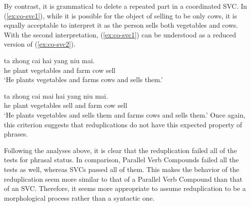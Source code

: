     \z
\z

By contrast, it is grammatical to delete a repeated part in a coordinated {SVC}. 
In (\ref{ex:co-svc1}), while it is possible for the object of selling to be only cows, it is equally acceptable to interpret it as the person sells both vegetables and cows. With the second interpretation, (\ref{ex:co-svc1}) can be understood as a reduced version of (\ref{ex:co-svc2}).

\ea
  \ea\label{ex:co-svc1}
  \gll ta zhong cai hai yang niu mai.\\
  he plant vegetables and farm cow sell\\
  \glt `He plants vegetables and farms cows and sells them.'
  
  \ex\label{ex:co-svc2}
  \gll ta zhong cai mai hai yang niu mai.\\
  he plant vegetables sell and farm cow sell\\
  \glt `He plants vegetables and sells them and farms cows and sells them.'
   \z
\z
Once again, this criterion suggests that reduplications do not have this expected property of phrases.


Following the analyses above, it is clear that the reduplication failed all of the tests for phrasal status. 
In comparison, Parallel Verb Compounds failed all the tests as well, whereas {SVC}s passed all of them.
This makes the behavior of the reduplication seem more similar to that of a Parallel Verb Compound than that of an {SVC}.
Therefore, it seems more appropriate to assume reduplication to be a morphological process rather than a syntactic one. 




